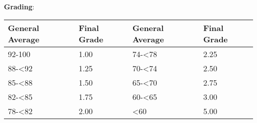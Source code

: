 \documentclass[12pt]{article}
\begin{document}
\vspace*{.25in}
\noindent\textbf{Grading}:

\begin{center}
  \begin{tabular}{ |l|l|l|l| }
    \hline
    General Average & Final Grade & General Average & Final Grade \\ \hline
    92-100 & 1.00 & 74-\textless78 & 2.25 \\ \hline
    88-\textless92 & 1.25 & 70-\textless74 & 2.50 \\ \hline
    85-\textless88 & 1.50 & 65-\textless70 & 2.75 \\ \hline
    82-\textless85 & 1.75 & 60-\textless65 & 3.00 \\ \hline
    78-\textless82 & 2.00 & \textless60 & 5.00 \\ \hline
  \end{tabular}
\end{center}

\iffalse
\vspace*{.25in}
\noindent\textbf{Class Policies:} 
\begin{itemize}
  \item Cheating will be punished according to university standards.
  \item Missed requirements are given a grade of 0. Excuses will be considered on a case-to-case basis.
  \item Use black or blue pens for written requirements.
  \item Attendance is not tracked. You can come in and leave at any time, but you're on your own for any activities or lectures you miss. 
  \item Avoid disruptive behavior.
  \item Put phones on silent. Vibrate is okay. Go outside room if you want to make or take a call.
  \item Contact me via e-mail if you wish to schedule a consultation. Please do it early.
  \item Feedback and criticism is welcomed.
\end{itemize}

\vspace*{.25in}

\vskip.25in
\noindent\textbf{Important Dates}:
\begin{center} \begin{minipage}{5in}
\begin{flushleft}
Bonifacio Day (Holiday) \dotfill Nov-30-2013\\
Christmas Break (Start) \dotfill Dec-19-2013\\
Christmas Break (End) \dotfill Jan-05-2013\\
First Exam \dotfill Jan-15-2014\\
Drop Deadline \dotfill Feb-20-2014\\
Second Exam  \dotfill Mar-15-2014\\
Report Deadline \dotfill Mar-30-2014\\
Project Deadline \dotfill Mar-30-2014\\
\end{flushleft}
\end{minipage}
\end{center}
\fi
\end{document}
